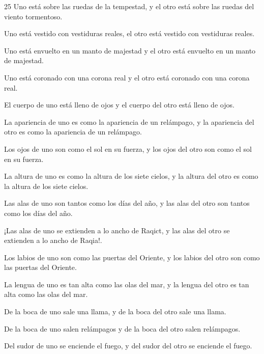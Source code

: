 \par 25 Uno está sobre las ruedas de la tempestad, y el otro está sobre las ruedas del viento tormentoso.

\par Uno está vestido con vestiduras reales, el otro está vestido con vestiduras reales.

\par Uno está envuelto en un manto de majestad y el otro está envuelto en un manto de majestad.

\par Uno está coronado con una corona real y el otro está coronado con una corona real.

\par El cuerpo de uno está lleno de ojos y el cuerpo del otro está lleno de ojos.

\par La apariencia de uno es como la apariencia de un relámpago, y la apariencia del otro es como la apariencia de un relámpago.

\par Los ojos de uno son como el sol en su fuerza, y los ojos del otro son como el sol en su fuerza.

\par La altura de uno es como la altura de los siete cielos, y la altura del otro es como la altura de los siete cielos.

\par Las alas de uno son tantos como los días del año, y las alas del otro son tantos como los días del año.

\par ¡Las alas de uno se extienden a lo ancho de Raqict, y las alas del otro se extienden a lo ancho de Raqia!.

\par Los labios de uno son como las puertas del Oriente, y los labios del otro son como las puertas del Oriente.

\par La lengua de uno es tan alta como las olas del mar, y la lengua del otro es tan alta como las olas del mar.

\par De la boca de uno sale una llama, y ​​de la boca del otro sale una llama.

\par De la boca de uno salen relámpagos y de la boca del otro salen relámpagos.

\par Del sudor de uno se enciende el fuego, y del sudor del otro se enciende el fuego.

